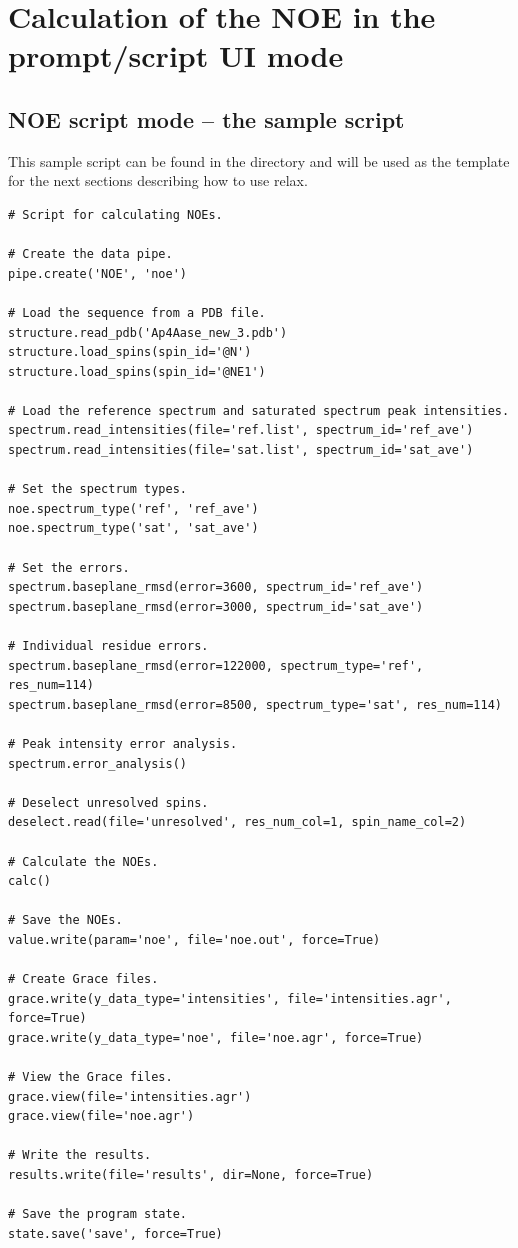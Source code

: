 
\section{Calculation of the NOE in the prompt/script UI mode}



\subsection{NOE script mode -- the sample script}

This sample script can be found in the  directory and will be used as the template for the next sections describing how to use relax.

\begin{lstlisting}
# Script for calculating NOEs.

# Create the data pipe.
pipe.create('NOE', 'noe')

# Load the sequence from a PDB file.
structure.read_pdb('Ap4Aase_new_3.pdb')
structure.load_spins(spin_id='@N')
structure.load_spins(spin_id='@NE1')

# Load the reference spectrum and saturated spectrum peak intensities.
spectrum.read_intensities(file='ref.list', spectrum_id='ref_ave')
spectrum.read_intensities(file='sat.list', spectrum_id='sat_ave')

# Set the spectrum types.
noe.spectrum_type('ref', 'ref_ave')
noe.spectrum_type('sat', 'sat_ave')

# Set the errors.
spectrum.baseplane_rmsd(error=3600, spectrum_id='ref_ave')
spectrum.baseplane_rmsd(error=3000, spectrum_id='sat_ave')

# Individual residue errors.
spectrum.baseplane_rmsd(error=122000, spectrum_type='ref', res_num=114)
spectrum.baseplane_rmsd(error=8500, spectrum_type='sat', res_num=114)

# Peak intensity error analysis.
spectrum.error_analysis()

# Deselect unresolved spins.
deselect.read(file='unresolved', res_num_col=1, spin_name_col=2)

# Calculate the NOEs.
calc()

# Save the NOEs.
value.write(param='noe', file='noe.out', force=True)

# Create Grace files.
grace.write(y_data_type='intensities', file='intensities.agr', force=True)
grace.write(y_data_type='noe', file='noe.agr', force=True)

# View the Grace files.
grace.view(file='intensities.agr')
grace.view(file='noe.agr')

# Write the results.
results.write(file='results', dir=None, force=True)

# Save the program state.
state.save('save', force=True)
\end{lstlisting}



